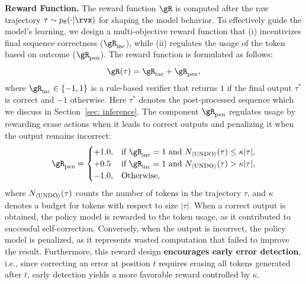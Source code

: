 \textbf{Reward Function.} 
The reward function $\gR$ is computed after the raw trajectory $\tau \sim p_\theta(\cdot | \rvx)$ for shaping the model behavior.
To effectively guide the model's learning, we design a multi-objective reward function that (i) incentivizes final sequence correctness ($\gR_\text{inc}$), while (ii) regulates the usage of the \bk token based on outcome ($\gR_\text{pen}$).
The reward function is formulated as follows:
\begin{equation}
    \gR(\tau) = \gR_\text{inc} + \gR_\text{pen},
\end{equation}
where $\gR_\text{inc} \in \{-1, 1\}$ is a rule-based verifier that returns $1$ if the final output $\tau^*$ is correct and $-1$ otherwise.
Here $\tau^*$ denotes the post-processed sequence which we discuss in Section~\ref{sec: inference}.
The component $\gR_\text{pen}$ regulates \bk usage by {rewarding} erase actions when it leads to correct outputs and {penalizing} it when the output remains incorrect:
\begin{equation}
    \gR_\text{pen} = \begin{cases}
        +1.0, & \text{if } \gR_\text{inc} = 1 \text{ and } N_{\bk}(\tau) \le \kappa |\tau|, \\
        + 0.5 & \text{if } \gR_\text{inc} = 1 \text{ and } N_{\bk}(\tau) > \kappa |\tau|, \\
        -1.0, & \text{Otherwise},
    \end{cases}
\end{equation}
where $N_{\langle\textnormal{UNDO}\rangle}(\tau)$ counts the number of \bk tokens in the trajectory $\tau$,  and $\kappa$ denotes a budget for \bk tokens with respect to size $|\tau|$.
When a correct output is obtained, the policy model is rewarded to the \bk token usage, as it contributed to successful self-correction.
Conversely, when the output is incorrect, the policy model is penalized, as it represents wasted computation that failed to improve the result.
Furthermore, this reward design \textbf{encourages early error detection}, i.e., since correcting an error at position $t$ requires erasing all tokens generated after $t$, early detection yields a more favorable reward controlled by $\kappa$.

